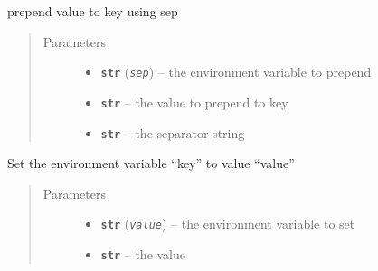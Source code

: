 \documentclass[a4paper,10pt,english]{sphinxmanual}
\begin{document}
\begin{fulllineitems}

\begin{fulllineitems}
\label{commands/apidoc/src:src.environment.Environ.prepend_value}
prepend value to key using sep
\begin{quote}\begin{description}
\item[{Parameters}] \leavevmode\begin{itemize}
\item {} 
\textbf{\texttt{str}} (\emph{\texttt{sep}}) -- the environment variable to prepend

\item {} 
\textbf{\texttt{str}} -- the value to prepend to key

\item {} 
\textbf{\texttt{str}} -- the separator string

\end{itemize}

\end{description}\end{quote}

\end{fulllineitems}


\begin{fulllineitems}
\label{commands/apidoc/src:src.environment.Environ.set}
Set the environment variable ``key'' to value ``value''
\begin{quote}\begin{description}
\item[{Parameters}] \leavevmode\begin{itemize}
\item {} 
\textbf{\texttt{str}} (\emph{\texttt{value}}) -- the environment variable to set

\item {} 
\textbf{\texttt{str}} -- the value

\end{itemize}

\end{description}\end{quote}

\end{fulllineitems}


\end{fulllineitems}
\end{document}
